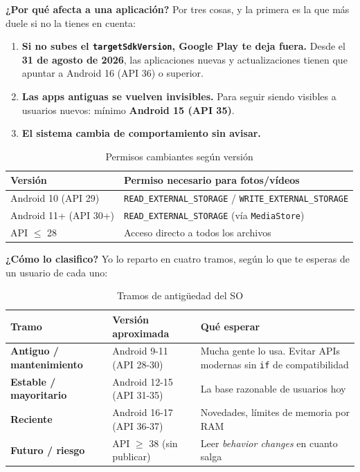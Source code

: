 \documentclass[11pt,a4paper]{article}
\newcommand{\code}[1]{\texttt{\color{ink}#1}}
\newcommand{\campo}[1]{\textbf{\color{ink}#1}}
\begin{document}
	\campo{¿Por qué afecta a una aplicación?}
	Por tres cosas, y la primera es la que más duele si no la tienes en cuenta:
	\begin{enumerate}[leftmargin=*,itemsep=0.15em]
		\item \textbf{Si no subes el \code{targetSdkVersion}, Google Play te deja fuera.} Desde el \textbf{31 de agosto de 2026}, las aplicaciones nuevas y actualizaciones tienen que apuntar a Android 16 (API 36) o superior.
		\item \textbf{Las apps antiguas se vuelven invisibles.} Para seguir siendo visibles a usuarios nuevos: mínimo \textbf{Android 15 (API 35)}.
		\item \textbf{El sistema cambia de comportamiento sin avisar.}
	\end{enumerate}
	
	\begin{table}[htbp]
		\centering
		\small
		\begin{tabular}{@{}l l@{}}
			\toprule
			\rowcolor{primary}
			\textcolor{paper}{\sffamily\bfseries Versión} & \textcolor{paper}{\sffamily\bfseries Permiso necesario para fotos/vídeos} \\
			\midrule
			Android 10 (API 29) & \code{READ\_EXTERNAL\_STORAGE} / \code{WRITE\_EXTERNAL\_STORAGE} \\
			\rowcolor{soft}
			Android 11+ (API 30+) & \code{READ\_EXTERNAL\_STORAGE} (vía \code{MediaStore}) \\
			API $\leq$ 28 & Acceso directo a todos los archivos \\
			\bottomrule
		\end{tabular}
		\caption{Permisos cambiantes según versión}
	\end{table}
	
	\campo{¿Cómo lo clasifico?}
	Yo lo reparto en cuatro tramos, según lo que te esperas de un usuario de cada uno:
	
	\begin{table}[htbp]
		\centering
		\small
		\begin{tabularx}{\textwidth}{@{}>{\RaggedRight\arraybackslash}p{3.5cm} >{\RaggedRight\arraybackslash}p{4cm} >{\RaggedRight\arraybackslash}X@{}}
			\toprule
			\rowcolor{primary}
			\textcolor{paper}{\sffamily\bfseries Tramo} & \textcolor{paper}{\sffamily\bfseries Versión aproximada} & \textcolor{paper}{\sffamily\bfseries Qué esperar} \\
			\midrule
			\textbf{Antiguo / mantenimiento} & Android 9-11 (API 28-30) & Mucha gente lo usa. Evitar APIs modernas sin \code{if} de compatibilidad \\
			\rowcolor{soft}
			\textbf{Estable / mayoritario} & Android 12-15 (API 31-35) & La base razonable de usuarios hoy \\
			\textbf{Reciente} & Android 16-17 (API 36-37) & Novedades, límites de memoria por RAM \\
			\rowcolor{soft}
			\textbf{Futuro / riesgo} & API $\geq$ 38 (sin publicar) & Leer \emph{behavior changes} en cuanto salga \\
			\bottomrule
		\end{tabularx}
		\caption{Tramos de antigüedad del SO}
	\end{table}
	
\end{document}
